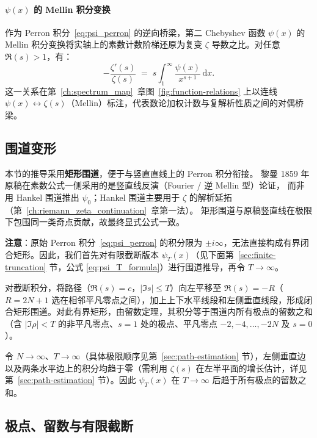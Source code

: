 \paragraph{$\psi(x)$ 的 Mellin 积分变换}
作为 Perron 积分~\eqref{eq:psi_perron} 的逆向桥梁，第二 Chebyshev 函数 $\psi(x)$ 的 Mellin 积分变换将实轴上的素数计数阶梯还原为复变 $\zeta$ 导数之比。对任意 $\Re(s) > 1$，有：
\begin{equation}
  -\frac{\zeta'(s)}{\zeta(s)} \;=\; s\int_{1}^{\infty}\frac{\psi(x)}{x^{s+1}}\,\mathrm{d}x.
\label{eq:psi_mellin}
\end{equation}
这一关系在第~\ref{ch:spectrum_map}~章图~\ref{fig:function-relations} 上以连线 $\psi(x) \leftrightarrow \zeta(s)$（Mellin）标注，代表数论加权计数与复解析性质之间的对偶桥梁。


\subsection{围道变形}

本节的推导采用\textbf{矩形围道}，便于与竖直直线上的 Perron 积分衔接。
黎曼 1859 年原稿在素数公式一侧采用的是竖直线反演（Fourier / 逆 Mellin 型）论证，
而非用 Hankel 围道推出 $\psi_0$；Hankel 围道主要用于 $\zeta$ 的解析延拓（第~\ref{ch:riemann_zeta_continuation}~章第一法）。
矩形围道与原稿竖直线在极限下包围同一类奇点贡献，故最终显式公式一致。

\textbf{注意}：原始 Perron 积分~\eqref{eq:psi_perron} 的积分限为 $\pm i\infty$，无法直接构成有界闭合矩形。因此，我们首先对有限截断版本 $\psi_T(x)$（见下面第~\ref{sec:finite-truncation} 节，公式 \eqref{eq:psi_T_formula}）进行围道推导，再令 $T\to\infty$。

对截断积分，将路径（$\Re(s)=c$，$|\Im s|\le T$）向左平移至 $\Re(s)=-R$（$R=2N+1$ 选在相邻平凡零点之间），加上上下水平线段和左侧垂直线段，形成闭合矩形围道。对此有界矩形，由留数定理，其积分等于围道内所有极点的留数之和（含 $|\Im\rho|<T$ 的非平凡零点、$s=1$ 处的极点、平凡零点 $-2,-4,\ldots,-2N$ 及 $s=0$）。

令 $N\to\infty$、$T\to\infty$（具体极限顺序见第~\ref{sec:path-estimation} 节），左侧垂直边以及两条水平边上的积分均趋于零（需利用 $\zeta(s)$ 在左半平面的增长估计，详见第~\ref{sec:path-estimation} 节）。因此 $\psi_T(x)$ 在 $T\to\infty$ 后趋于所有极点的留数之和。

\subsection{极点、留数与有限截断}\label{sec:residue-sum}
\label{sec:finite-truncation}

